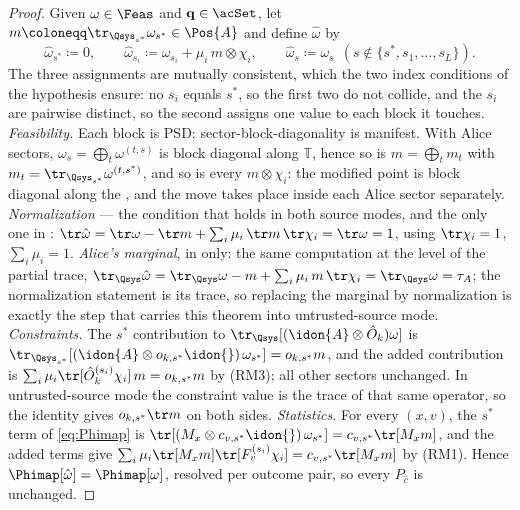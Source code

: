 \begin{proof}
Given $\omega\in\Feas$ and $\mathbf q\in\acSet$, let
$m\coloneqq\tr_{\Qsys_{s^{*}}}\omega_{s^{*}}\in\Pos{A}$ and define
$\hat\omega$ by
\begin{equation*}
  \hat\omega_{s^{*}}\coloneqq0,\qquad
  \hat\omega_{s_i}\coloneqq\omega_{s_i}+\mu_i\,m\otimes\chi_i,\qquad
  \hat\omega_{s}\coloneqq\omega_{s}\ \ (s\notin\{s^{*},s_1,\dots,s_L\}).
\end{equation*}
The three assignments are mutually consistent, which the two index
conditions of the hypothesis ensure: no $s_i$ equals $s^{*}$, so
the first two do not collide, and the $s_i$ are pairwise distinct, so the
second assigns one value to each block it touches.
\emph{Feasibility.} Each block is PSD; sector-block-diagonality is
manifest. With Alice sectors, $\omega_s=\bigoplus_t\omega^{(t,s)}$ is block
diagonal along $\mathbb{T}$, hence so is $m=\bigoplus_tm_t$ with
$m_t=\tr_{\Qsys_{s^{*}}}\omega^{(t,s^{*})}$, and so is every
$m\otimes\chi_i$: the modified point is block diagonal along the
, and the move takes place inside each
Alice sector separately. \emph{Normalization} --- the condition that holds
in both source modes, and the only one in
:
$\tr\hat\omega=\tr\omega-\tr m+\sum_i\mu_i\,\tr m\,\tr\chi_i
=\tr\omega=1$, using $\tr\chi_i=1$, $\sum_i\mu_i=1$. \emph{Alice's
marginal}, in  only: the same computation at the
level of the partial trace,
$\tr_{\Qsys}\hat\omega
=\tr_{\Qsys}\omega-m+\sum_i\mu_i\,m\,\tr\chi_i
=\tr_{\Qsys}\omega=\tau_A$; the normalization statement is its trace,
so replacing the marginal by normalization is exactly the step that
carries this theorem into untrusted-source mode.
\emph{Constraints.} The $s^{*}$ contribution to
$\tr_{\Qsys}[(\idon{A}\otimes\hat O_k)\omega]$ is
$\tr_{\Qsys_{s^{*}}}[(\idon{A}\otimes o_{k,s^{*}}\idon{})\,\omega_{s^{*}}]
=o_{k,s^{*}}m$, and the added contribution is
$\sum_i\mu_i\tr[\hat O^{(s_i)}_k\chi_i]\,m=o_{k,s^{*}}m$ by (RM3); all
other sectors unchanged. In untrusted-source mode the constraint value
is the trace of that same operator, so the identity gives
$o_{k,s^{*}}\tr m$ on both sides.
\emph{Statistics.} For every $(x,v)$, the $s^{*}$ term of
\eqref{eq:Phimap} is
$\tr[(M_x\otimes c_{v,s^{*}}\idon{})\,\omega_{s^{*}}]
=c_{v,s^{*}}\tr[M_xm]$, and the added terms give
$\sum_i\mu_i\tr[M_xm]\tr[F^{(s_i)}_v\chi_i]=c_{v,s^{*}}\tr[M_xm]$ by
(RM1). Hence $\Phimap[\hat\omega]=\Phimap[\omega]$, resolved per outcome
pair, so every $P_{\hat c}$ is unchanged.

\end{proof}
